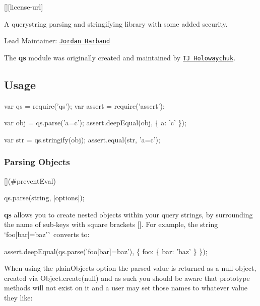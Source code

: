 \href{https://travis-ci.org/ljharb/qs}{\tt } \href{https://david-dm.org/ljharb/qs}{\tt } \href{https://david-dm.org/ljharb/qs?type=dev}{\tt } \mbox{[}\mbox{]}\mbox{[}license-\/url\mbox{]} \href{http://npm-stat.com/charts.html?package=qs}{\tt }

\href{https://npmjs.org/package/qs}{\tt }

A querystring parsing and stringifying library with some added security.

Lead Maintainer\+: \href{https://github.com/ljharb}{\tt Jordan Harband}

The {\bfseries qs} module was originally created and maintained by \href{https://github.com/visionmedia/node-querystring}{\tt TJ Holowaychuk}.

\subsection*{Usage}


\begin{DoxyCode}
var qs = require('qs');
var assert = require('assert');

var obj = qs.parse('a=c');
assert.deepEqual(obj, \{ a: 'c' \});

var str = qs.stringify(obj);
assert.equal(str, 'a=c');
\end{DoxyCode}


\subsubsection*{Parsing Objects}

\mbox{[}\mbox{]}(\#prevent\+Eval) 
\begin{DoxyCode}
qs.parse(string, [options]);
\end{DoxyCode}


{\bfseries qs} allows you to create nested objects within your query strings, by surrounding the name of sub-\/keys with square brackets {\ttfamily \mbox{[}\mbox{]}}. For example, the string `\textquotesingle{}foo\mbox{[}bar\mbox{]}=baz'\`{} converts to\+:


\begin{DoxyCode}
assert.deepEqual(qs.parse('foo[bar]=baz'), \{
    foo: \{
        bar: 'baz'
    \}
\});
\end{DoxyCode}


When using the {\ttfamily plain\+Objects} option the parsed value is returned as a null object, created via {\ttfamily Object.\+create(null)} and as such you should be aware that prototype methods will not exist on it and a user may set those names to whatever value they like\+:


